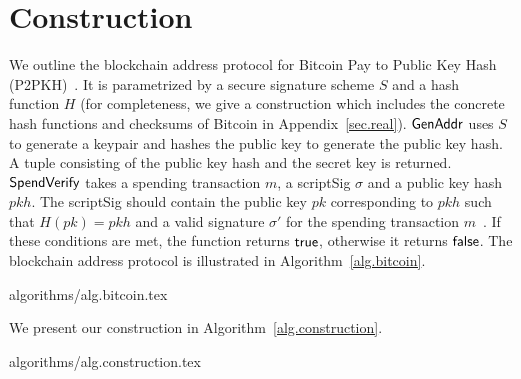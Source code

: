 \section{Construction}\label{section:construction}

We outline the blockchain address protocol for Bitcoin Pay to Public Key Hash (P2PKH)~\cite{bitcoin-dev-guide}. It is parametrized by a secure signature scheme $S$ and a hash function $H$ (for completeness, we give a construction which includes the concrete hash
functions and checksums of Bitcoin in Appendix~\ref{sec.real}).
$\mathsf{GenAddr}$ uses $S$ to generate a keypair and hashes the public key to generate the public key hash. A tuple consisting of the public key hash and the secret key is returned.
$\mathsf{SpendVerify}$ takes a spending transaction $m$, a scriptSig $\sigma$ and a public key hash $pkh$. The scriptSig should contain the public key $pk$ corresponding to $pkh$ such that $H(pk) = pkh$ and a valid signature $\sigma'$ for the spending transaction $m$~\cite{bitcoin-dev-guide}. If these conditions are met, the function returns $\mathsf{true}$, otherwise it returns $\mathsf{false}$.
The blockchain address protocol is illustrated in Algorithm~\ref{alg.bitcoin}.

{algorithms/alg.bitcoin.tex}

We present our construction in Algorithm~\ref{alg.construction}.

{algorithms/alg.construction.tex}
